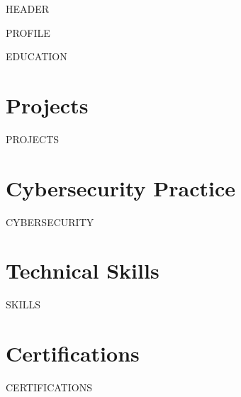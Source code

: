 


{{HEADER}}

{{PROFILE}}

{{EDUCATION}}

\section{Projects}
{{PROJECTS}}

\section{Cybersecurity Practice}
{{CYBERSECURITY}}

\section{Technical Skills}
{{SKILLS}}

\section{Certifications}
{{CERTIFICATIONS}}

